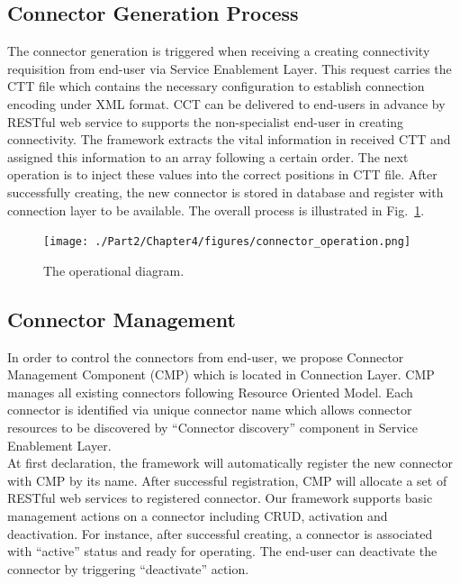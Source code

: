\subsection{Connector Generation Process}
The connector generation is triggered when receiving a creating connectivity requisition from end-user via Service Enablement Layer. This request carries the CTT file which contains the necessary configuration to establish connection encoding under XML format. CCT can be delivered to end-users in advance by RESTful web service to supports the non-specialist end-user in creating connectivity. The framework extracts the vital information in received CTT and assigned this information to an array following a certain order. The next operation is to inject these values into the correct positions in CTT file. After successfully creating, the new connector is stored in database and register with connection layer to be available. The overall process is illustrated in Fig.~\ref{fig:c4_connector_operation}.

\begin{figure}[h!] 
 \begin{center} 
 \texttt{[image: ./Part2/Chapter4/figures/connector\_operation.png]} 
    \caption{The operational diagram.}
     \label{fig:c4_connector_operation}
  \end{center} 
\end{figure}

\subsection{Connector Management}
In order to control the connectors from end-user, we propose Connector Management Component (CMP) which is located in Connection Layer. CMP manages all existing connectors following Resource Oriented Model.  Each connector is identified via unique connector name which allows connector resources to be discovered by “Connector discovery” component in Service Enablement Layer. \\

At first declaration, the framework will automatically register the new connector with CMP by its name. After successful registration, CMP will allocate a set of RESTful web services to registered connector. Our framework supports basic management actions on a connector including CRUD, activation and deactivation. For instance, after successful creating, a connector is associated with “active” status and ready for operating. The end-user can deactivate the connector by triggering “deactivate” action.
